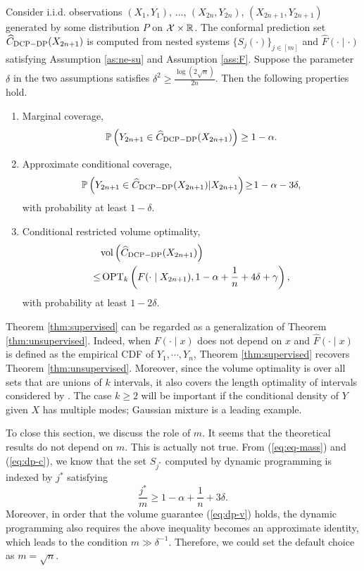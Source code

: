 \begin{theorem}\label{thm:supervised}
Consider i.i.d. observations $(X_1,Y_1)$, $\dots$, $(X_{2n},Y_{2n})$, $(X_{2n+1},Y_{2n+1})$ generated by some distribution $P$ on $\mathcal{X} \times \mathbb{R}$. The conformal prediction set $\widehat{C}_{\rm DCP-DP}(X_{2n+1})$ is computed from nested systems $\{S_j(\cdot)\}_{j\in[m]}$ and $\widehat{F}(\cdot\mid\cdot)$ satisfying Assumption \ref{as:ne-su} and Assumption \ref{ass:F}. Suppose the parameter $\delta$ in the two assumptions satisfies $\delta^2\geq \frac{\log(2\sqrt{n})}{2n}$. Then the following properties hold. 
    \begin{enumerate}
        \item Marginal coverage, 
        $$\mathbb{P}\left(Y_{2n+1} \in \widehat{C}_{\rm DCP-DP}(X_{2n+1})\right)\geq 1-\alpha.$$
        \item Approximate conditional coverage,
        $$\mathbb{P}\left(Y_{2n+1}\in \widehat{C}_{\rm DCP-DP}(X_{2n+1})| X_{2n+1}\right)\!\geq\! 1-\alpha-3\delta,$$
        with probability at least $1-\delta$.
        \item Conditional restricted volume optimality,
        \begin{align*}
        &\mathrm{vol}\left(\widehat{C}_{\rm DCP-DP}(X_{2n+1})\right) \\
        \leq& \operatorname{OPT}_k\left(F(\cdot\mid X_{2n+1}),1-\alpha+\frac{1}{n}+4\delta+\gamma\right),
        \end{align*}
        with probability at least $1-2\delta$.
    \end{enumerate} 
\end{theorem}

Theorem \ref{thm:supervised} can be regarded as a generalization of Theorem \ref{thm:unsupervised}. Indeed, when $F(\cdot\mid x)$ does not depend on $x$ and $\widehat{F}(\cdot\mid x)$ is defined as the empirical CDF of $Y_1,\cdots,Y_n$, Theorem \ref{thm:supervised} recovers Theorem \ref{thm:unsupervised}. Moreover, since the volume optimality is over all sets that are unions of $k$ intervals, it also covers the length optimality of intervals considered by \cite{chernozhukov2021distributional}. The case $k\geq 2$ will be important if the conditional density of $Y$ given $X$ has multiple modes; Gaussian mixture is a leading example.




\iffalse
To close this section, we discuss the role of $m$. It seems that the theoretical results do not depend on $m$. This is actually not true. From (\ref{eq:eq-mass}) and (\ref{eq:dp-c}), we know that the set $S_{j^*}$ computed by dynamic programming is indexed by $j^*$ satisfying
$$\frac{j^*}{m}\geq 1-\alpha+\frac{1}{n}+3\delta.$$
Moreover, in order that the volume guarantee (\ref{eq:dp-v}) holds, the dynamic programming also requires the above inequality becomes an approximate identity, which leads to the condition $m\gg \delta^{-1}$. Therefore, we could set the default choice as $m=\sqrt{n}$.

